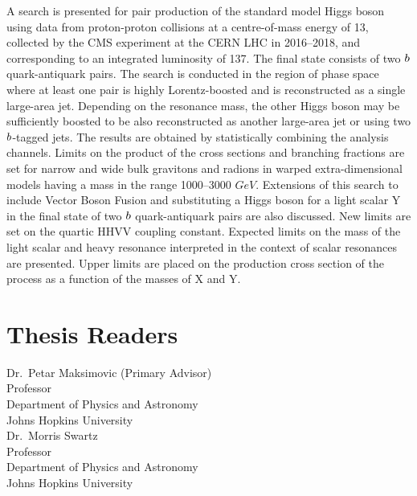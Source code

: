 %
A search is presented for pair production of the standard model Higgs boson using data from proton-proton collisions at a centre-of-mass energy of 13\TeV, collected by the CMS experiment at the CERN LHC in 2016--2018, and corresponding to an integrated luminosity of 137\fbinv. 
The final state consists of two $b$ quark-antiquark pairs. 
The search is conducted in the region of phase space where at least one pair is highly Lorentz-boosted and is reconstructed as a single large-area jet. 
Depending on the resonance mass, the other Higgs boson may be sufficiently boosted to be also reconstructed as another large-area jet or using two $b$-tagged jets. 
The results are obtained by statistically combining the analysis channels. Limits on the product of the cross sections and branching fractions are set for narrow and wide bulk gravitons and radions in warped extra-dimensional models having a mass in the range 1000--3000 $GeV$.
Extensions of this search to include Vector Boson Fusion and substituting a Higgs boson for a light scalar Y in the final state of two $b$ quark-antiquark pairs are also discussed.
New limits are set on the quartic HHVV coupling constant. Expected limits on the mass of the light scalar and heavy resonance interpreted in the context of scalar resonances are presented.
Upper limits are placed on the production cross section of the process as a function of the masses of X and Y.
\clearpage
%
\section*{Thesis Readers}
\begin{singlespace}
%
\noindent Dr.~Petar Maksimovic (Primary Advisor)\\
\indent \indent Professor\\
\indent \indent Department of Physics and Astronomy\\
\indent \indent Johns Hopkins University\\

\noindent Dr.~Morris Swartz\\
\indent \indent Professor\\
\indent \indent Department of Physics and Astronomy\\
\indent \indent Johns Hopkins University\\

%
\end{singlespace}